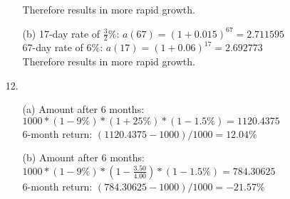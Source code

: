 \documentclass{article}
\begin{document}
\begin{itemize}
\begin{itemize}
                        Therefore  results in more rapid growth.
                  \item [(b)]
                        17-day rate of $\frac{3}{2}\%$: $a(67)=(1+0.015)^{67}=2.711595$\\
                        67-day rate of $6\%$: $a(17)=(1+0.06)^{17}=2.692773$\\
                        Therefore  results in more rapid growth.
            \end{itemize}
      \item [12.]
            \begin{itemize}
                  \item [(a)]
                        Amount after 6 months: $1000*(1-9\%)*(1+25\%)*(1-1.5\%)=1120.4375$\\
                        6-month return: $(1120.4375-1000)/1000=\boxed{12.04\%}$
                  \item [(b)]
                        Amount after 6 months: $1000*(1-9\%)*(1-\frac{3.50}{4.00})*(1-1.5\%)=784.30625$\\
                        6-month return: $(784.30625-1000)/1000=\boxed{-21.57\%}$
            \end{itemize}
\end{itemize}
\end{document}
